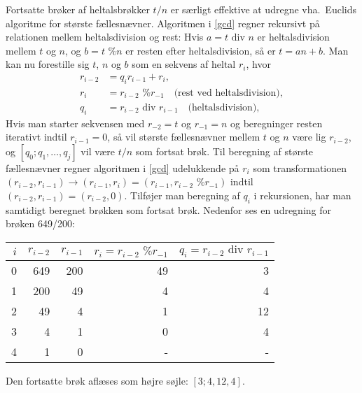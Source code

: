 \documentclass[a4paper,12pt]{article}
\begin{document}
Fortsatte brøker af heltalsbrøkker $t/n$ er særligt effektive at udregne vha.\ Euclids algoritme for største fællesnævner. Algoritmen i \ref{gcd} regner rekursivt på relationen mellem heltalsdivision og rest: Hvis $a = t \text{ div } n$ er heltalsdivision mellem $t$ og $n$, og $b = t \text{ \% } n$ er resten efter heltalsdivision, så er $t = a n + b$. Man kan nu forestille sig $t$, $n$ og $b$ som en sekvens af heltal $r_i$, hvor
\begin{align}
  r_{i-2} &= q_i r_{i-1} + r_i,
  \\r_i &= r_{i-2}\text{ \% }r_{-1}\quad\text{(rest ved heltalsdivision)},
  \\q_i &= r_{i-2}\text{ div }r_{i-1}\quad\text{(heltalsdivision)},
\end{align}
Hvis man starter sekvensen med $r_{-2} = t$ og $r_{-1}=n$ og beregninger resten iterativt indtil $r_{i-1}=0$, så vil største fællesnævner mellem $t$ og $n$ være lig $r_{i-2}$, og $[q_0; q_1,\ldots,q_j]$ vil være $t/n$ som fortsat brøk. Til beregning af største fællesnævner regner algoritmen i \ref{gcd} udelukkende på $r_i$ som transformationen $(r_{i-2}, r_{i-1}) \rightarrow (r_{i-1}, r_i)  = (r_{i-1}, r_{i-2}\text{ \% }r_{-1})$ indtil $(r_{i-2}, r_{i-1}) = (r_{i-2},0)$. Tilføjer man beregning af $q_i$ i rekursionen, har man samtidigt beregnet brøkken som fortsat brøk. Nedenfor ses en udregning for brøken 649/200:
\begin{center}
  \begin{tabular}{|r|r|r|r|r|}
    \hline
    $i$ & $r_{i-2}$ & $r_{i-1}$ & $r_i = r_{i-2}\text{ \% }r_{-1} $ & $q_i = r_{i-2} \text{ div } r_{i-1}$\\
    \hline
    0 & 649 & 200 & 49 & 3 \\
    1 & 200 & 49 & 4 & 4\\
    2 & 49 & 4 & 1  & 12\\
    3 & 4 & 1 & 0  & 4\\
    4 & 1 & 0 & -  & -\\
    \hline
  \end{tabular}
\end{center}
Den fortsatte brøk aflæses som højre søjle: $[3; 4, 12, 4]$.
\end{document}
